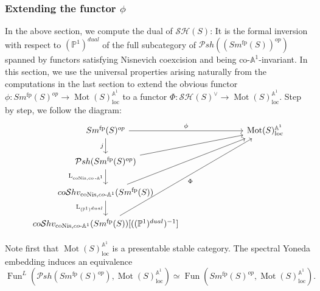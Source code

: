 \documentclass{article}
\theoremstyle{definition}
\newcommand{\on}{\operatorname}
\begin{document}
\subsubsection{Extending the functor $\phi$}
In the above section, we compute the dual of $\mathcal{SH}(S)$: It is the formal inversion with respect to $(\mathbb{P}^1)^{dual}$ of the full subcategory of $\mathcal{P}sh((Sm^{\on{fp}}(S))^{op})$ spanned by functors satisfying Nisnevich coexcision and being co-$\mathbb{A}^1$-invariant. In this section, we use the universal properties arising naturally from the computations in the last section to extend the obvious functor $\phi: Sm^{\on{fp}}(S)^{op}\rightarrow \on{Mot}(S)_{\on{loc}}^{\mathbb{A}^1}$ to a functor $\Phi: \mathcal{SH}(S)^{\vee}\rightarrow \on{Mot}(S)_{\on{loc}}^{\mathbb{A}^1}$. Step by step, we follow the diagram:
\[\begin{tikzcd}
	{Sm^{\on{fp}}(S)^{op}} &&& {\on{Mot}(S)_{\on{loc}}^{\mathbb{A}^1}} \\
	{\mathcal{P}sh(Sm^{\on{fp}}(S)^{op})} \\
	{co\mathcal{S}hv_{\on{coNis},co{\text -}\mathbb{A}^1}(Sm^{\on{fp}}(S))} \\
	{co\mathcal{S}hv_{\on{coNis},co{\text -}\mathbb{A}^1}(Sm^{\on{fp}}(S))[((\mathbb{P}^1)^{dual})^{-1}]}
	\arrow["\phi", from=1-1, to=1-4]
	\arrow["j"', from=1-1, to=2-1]
	\arrow[from=2-1, to=1-4]
	\arrow["{\on{L}_{\on{coNis},\on{co}{\text -}\mathbb{A}^1}}"', from=2-1, to=3-1]
	\arrow[from=3-1, to=1-4]
	\arrow["{\on{L}_{(\mathbb{P}^1)^{dual}}}"', from=3-1, to=4-1]
	\arrow["\Phi"', from=4-1, to=1-4]
\end{tikzcd}\]


Note first that $\on{Mot}(S)_{\on{loc}}^{\mathbb{A}^1}$ is a presentable stable category. The spectral Yoneda embedding induces an equivalence \[\on{Fun}^{L}(\mathcal{P}sh(Sm^{\on{fp}}(S)^{op}), \on{Mot}(S)_{\on{loc}}^{\mathbb{A}^1})\simeq\on{Fun}(Sm^{\on{fp}}(S)^{op},\on{Mot}(S)_{\on{loc}}^{\mathbb{A}^1}).\]
\end{document}
